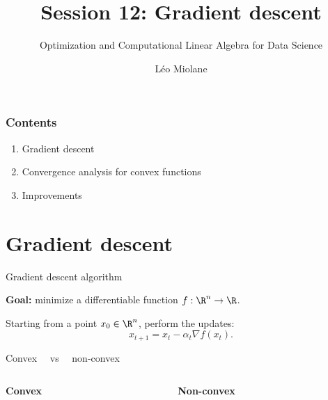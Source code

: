 \documentclass{beamer}
\title{Session 12: Gradient descent}
\subtitle{Optimization and Computational Linear Algebra for Data Science}
\author{Léo Miolane}
\date{}
\begin{document}
\setcounter{showProgressBar}{0}
\setcounter{showSlideNumbers}{0}

\frame{\titlepage}
\setcounter{framenumber}{0}
\setcounter{showSlideNumbers}{1}

\begin{frame}
	\frametitle{Contents}
	\begin{enumerate}
		\item Gradient descent
		\item Convergence analysis for convex functions
		\item Improvements
	\end{enumerate}
\end{frame}

\section{Gradient descent}

\begin{frame}[t]{Gradient descent algorithm}
	\grid

	\textbf{Goal:} minimize a differentiable function $f: \R^n \to \R$.
	\vspace{-0.2cm}
	\begin{exampleblock}{}
		Starting from a point $x_0 \in \R^n$, perform the updates:
		$$
		x_{t+1} = x_t - \alpha_t \nabla f(x_t).
		$$
	\end{exampleblock}

\end{frame}

\begin{frame}[t]{Convex  \ \ vs \ \ non-convex}
	\grid

	\begin{columns}
		\begin{column}{0.45\textwidth}
			\begin{center}
				\textbf{Convex}
			\end{center}
			\vspace{7cm}
	\end{column}
	\vrule
		\begin{column}{0.55\textwidth}
			\begin{center}
				\textbf{Non-convex}
			\end{center}
			\vspace{7cm}
	\end{column}
	\end{columns}

\end{frame}
\end{document}
